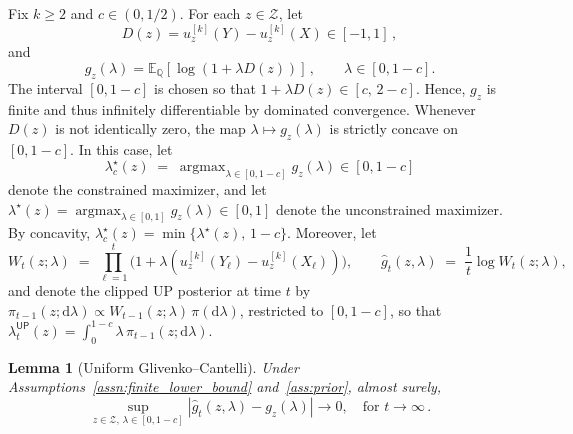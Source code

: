 \documentclass[12pt,twoside]{article}
\theoremstyle{plain}
\newtheorem{lemma}{Lemma}
\theoremstyle{definition}
\theoremstyle{remark}
\DeclareMathOperator*{\argmax}{argmax}
\newcommand{\calZ}{\mathcal{Z}}
\newcommand{\Esymb}{\mathbb{E}}
\newcommand{\Qsymb}{\mathbb{Q}}
\newcommand{\Ex}[2]{\Esymb_{{#1}}\left[{#2}\right]}
\newcommand{\fbet}{\lambda}  %
\newcommand{\up}{\mathsf{UP}}
\begin{document}
Fix $k\geq 2$ and $c\in(0,1/2)$. For each
$z\in\calZ$, let
\begin{equation*}
    D(z) = u_z^{[k]}(Y) - u_z^{[k]}(X)\in[-1,1]\,,
\end{equation*}
and 
\begin{equation*}
    g_z(\lambda)=\Ex{\Qsymb}{\log(1 + \lambda D(z))}\,,
    \qquad \lambda\in[0, 1-c].
\end{equation*}
The interval $[0,1-c]$ is chosen so that $1 + \lambda D(z)\in[c,\,2-c]$. Hence, $g_z$ is finite and thus infinitely differentiable by dominated convergence. Whenever $D(z)$ is not identically zero, the map $\lambda\mapsto g_z(\lambda)$ is strictly concave on $[0,1-c]$. In this case, let
\begin{equation*}
    \fbet^\star_c(z) \;=\; \argmax_{\lambda\in[0,1-c]} g_z(\lambda)\in[0,1-c]
\end{equation*}
denote the constrained maximizer, and let $\lambda^\star(z)=
\argmax_{\lambda\in[0,1]}g_z(\lambda)\in[0,1]$ denote the unconstrained
maximizer. By concavity, $\fbet^\star_c(z)=\min\{\lambda^\star(z),\,1-c\}$. Moreover, let
\begin{equation*}
    W_t(z;\lambda) \;=\; \prod_{\ell=1}^{t}\bigl(1+\lambda(u_z^{[k]}(Y_\ell)-u_z^{[k]}(X_\ell))\bigr),
    \qquad \hat g_t(z,\lambda) \;=\; \frac{1}{t}\log W_t(z;\lambda),
\end{equation*}
and denote the clipped UP posterior at time $t$ by
$\pi_{t-1}(z;\mathrm{d}\lambda)\propto W_{t-1}(z;\lambda)\,\pi(\mathrm{d}\lambda)$,
restricted to $[0,1-c]$, so that
$\fbet_t^\up(z)=\int_0^{1-c}\lambda\,\pi_{t-1}(z;\mathrm{d}\lambda)$.

\begin{lemma}[Uniform Glivenko--Cantelli]\label{lem:uniformGC}
Under Assumptions~\ref{assn:finite_lower_bound} and~\ref{ass:prior}, almost surely,
\begin{equation*}
    \sup_{z\in\calZ,\,\lambda\in[0,1-c]}
    \left|\hat g_t(z,\lambda)-g_z(\lambda)\right|
    \to 0,\quad \textrm{for }t\to \infty\,.
\end{equation*}
\end{lemma}
\end{document}

